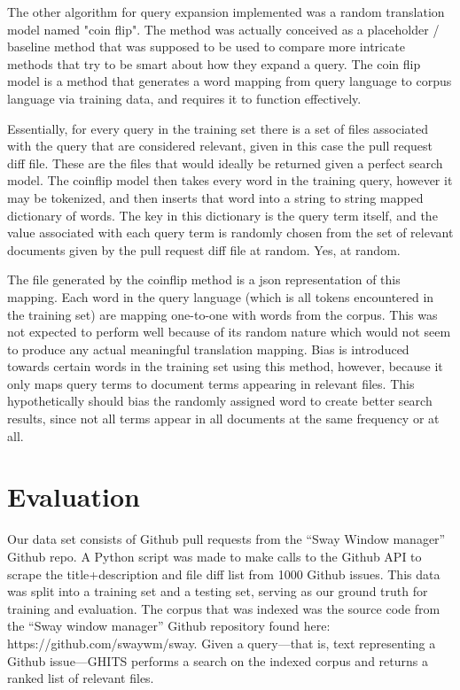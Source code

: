 \documentclass[10pt,a4paper]{article}
\begin{document}
The other algorithm for query expansion implemented was a random translation model named
"coin flip". The method was actually conceived as a placeholder / baseline method that was supposed
to be used to compare more intricate methods that try to be smart about how they
expand a query. The coin flip model is a method that generates a word mapping
from query language to corpus language via training data, and requires it to function
effectively.

Essentially, for every query in the training set there is a set of files
associated with the query that are considered relevant, given in this case the
pull request diff file. These are the files that would ideally be returned given
a perfect search model. The coinflip model then takes every word in the training
query, however it may be tokenized, and then inserts that word into a string to
string mapped dictionary of words. The key in this dictionary is the query term
itself, and the value associated with each query term is randomly chosen from the
set of relevant documents given by the pull request diff file at random. Yes, at
random.

The file generated by the coinflip method is a json representation of this mapping.
Each word in the query language (which is all tokens encountered in the training set)
are mapping one-to-one with words from the corpus. This was not expected to perform
well because of its random nature which would not seem to produce any
actual meaningful translation mapping. Bias is introduced towards certain words
in the training set using this method, however, because it only maps query terms
to document terms appearing in relevant files. This hypothetically should bias
the randomly assigned word to create better search results, since not all terms
appear in all documents at the same frequency or at all.

\section{Evaluation}

Our data set consists of Github pull requests from the “Sway Window manager” Github repo. A Python script was made to make calls to the Github API to scrape the title+description and file diff list from 1000 Github issues. This data was split into a training set and a testing set, serving as our ground truth for training and evaluation. The corpus that was indexed was the source code from the “Sway window manager” Github repository found here: https://github.com/swaywm/sway. Given a query—that is, text representing a Github issue—GHITS performs a search on the indexed corpus and returns a ranked list of relevant files.
\end{document}
